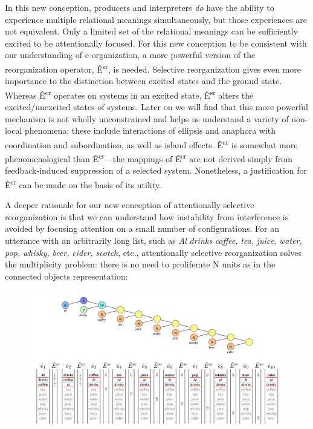   In this new conception, producers and interpreters \textit{do} have the ability to experience multiple relational meanings simultaneously, but those experiences are not equivalent. Only a limited set of the relational meanings can be sufficiently excited to be attentionally focused. For this new conception to be consistent with our understanding of e-organization, a more powerful version of the reorganization operator, Ê\textsuperscript{sr},  is needed. Selective reorganization gives even more importance to the distinction between excited states and the ground state. Whereas Ê\textsuperscript{cr} operates on systems in an excited state, Ê\textsuperscript{sr} alters the excited/unexcited states of systems. Later on we will find that this more powerful mechanism is not wholly unconstrained and helps us understand a variety of non-local phenomena; these include interactions of ellipsis and anaphora with coordination and subordination, as well as island effects. Ê\textsuperscript{sr} is somewhat more phenomenological than Ê\textsuperscript{cr}—the mappings of Ê\textsuperscript{sr} are not derived simply from feedback-induced suppression of a selected system. Nonetheless, a justification for Ê\textsuperscript{sr} can be made on the basis of its utility.

  A deeper rationale for our new conception of attentionally selective reorganization is that we can understand how instability from interference is avoided by focusing attention on a small number of configurations.  For an utterance with an arbitrarily long list, such as \textit{Al} \textit{drinks} \textit{coffee,} \textit{tea,} \textit{juice,} \textit{water,} \textit{pop,} \textit{whisky,} \textit{beer,} \textit{cider,} \textit{scotch}, etc., attentionally selective reorganization solves the multiplicity problem: there is no need to proliferate N units as in the connected objects representation: 

  
\begin{figure}
\includegraphics[width=\textwidth]{figures/Tilsen-img104.png}
\caption{\missingcaption}
\label{fig:}
\end{figure}
 


